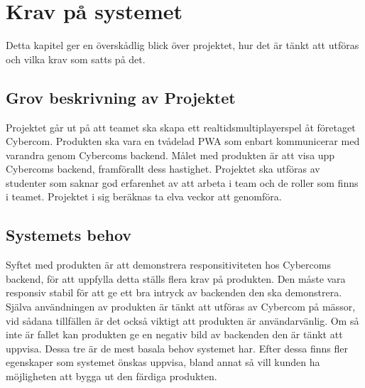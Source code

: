 \documentclass[10pt]{article}
\begin{document}
		
\pagebreak
\section{Krav på systemet}
	Detta kapitel ger en överskådlig blick över projektet, hur det är tänkt att utföras och vilka krav som satts på det.

	\subsection{Grov beskrivning av Projektet}
	Projektet går ut på att teamet ska skapa ett realtidsmultiplayerspel åt företaget Cybercom. Produkten ska vara en tvådelad PWA som enbart kommunicerar med varandra genom Cybercoms backend. Målet med produkten är att visa upp Cybercoms backend, framförallt dess hastighet.
	Projektet ska utföras av studenter som saknar god erfarenhet av att arbeta i team och de roller som finns i teamet. Projektet i sig beräknas ta elva veckor att genomföra. 
	
	\subsection{Systemets behov}
	Syftet med produkten är att demonstrera responsitiviteten hos Cybercoms backend, för att uppfylla detta ställs flera krav på produkten. Den måste vara responsiv stabil för att ge ett bra intryck av backenden den ska demonstrera. Själva användningen av produkten är tänkt att utföras av Cybercom på mässor, vid sådana tillfällen är det också viktigt att produkten är användarvänlig. Om så inte är fallet kan produkten ge en negativ bild av backenden den är tänkt att uppvisa. Dessa tre är de mest basala behov systemet har. Efter dessa finns fler egenskaper som systemet önskas uppvisa, bland annat så vill kunden ha möjligheten att bygga ut den färdiga produkten.
	
	
\end{document}
